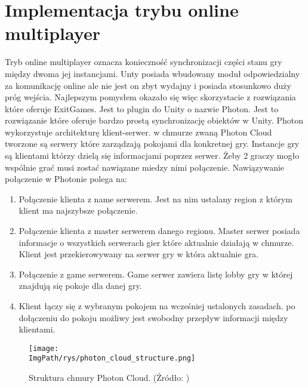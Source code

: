 \documentclass[a4paper,12pt,twoside,openany]{report}
\newcommand{\ImgPath}{.}
\begin{document}
\section{Implementacja trybu online multiplayer}
\label{implementation_online}
Tryb online multiplayer oznacza konieczność synchronizacji części stanu gry między dwoma jej instancjami. Unty posiada wbudowany moduł odpowiedzialny za komunikację online ale nie jest on zbyt wydajny i posiada stosunkowo duży próg wejścia. Najlepszym pomysłem okazało się więc skorzystacie z rozwiązania które oferuje ExitGames. Jest to plugin do Unity o nazwie Photon. Jest to rozwiązanie które oferuje bardzo prostą synchronizację obiektów w Unity. Photon wykorzystuje architekturę klient-serwer. w chmurze zwaną Photon Cloud tworzone są serwery które zarządzają pokojami dla konkretnej gry. Instancje gry są klientami którzy dzielą się informacjami poprzez serwer. Żeby 2 graczy mogło wspólnie grać musi zostać nawiązane miedzy nimi połączenie. Nawiązywanie połączenie w Photonie polega na:
\begin{enumerate}
    \item Połączenie klienta z name serwerem. Jest na nim ustalany region z którym klient ma najszybsze połączenie.
    \item Połączenie klienta z master serwerem danego regionu. Master serwer posiada informacje o wszystkich serwerach gier które aktualnie działają w chmurze. Klient jest przekierowywany na serwer gry w która aktualnie gra.
    \item Połączenie z game serwerem. Game serwer zawiera listę lobby gry w której znajdują się pokoje dla danej gry.
    \item Klient łączy się z wybranym pokojem na wcześniej ustalonych zasadach. po dołączeniu do pokoju możliwy jest swobodny przepływ informacji między klientami.
\end{enumerate}

\begin{figure}[H]
	\begin{center}
\centering
\texttt{[image: \\ImgPath/rys/photon\_cloud\_structure.png]}
\end{center}
	\caption{Struktura chmury Photon Cloud. (Źródło: \cite{photn_doc_reg})}
	\label{photon_cloud_structure}
\end{figure}
\end{document}
